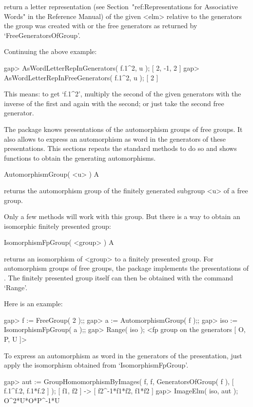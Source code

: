 return a letter representation
(see Section~"ref:Representations for Associative Words" in the {\GAP}
Reference Manual)
of the given <elm> relative to the generators the group was created
with or the free generators as returned by `FreeGeneratorsOfGroup'.

Continuing the above example:

\beginexample
gap> AsWordLetterRepInGenerators( f.1^2, u );    
[ 2, -1, 2 ]
gap> AsWordLetterRepInFreeGenerators( f.1^2, u );
[ 2 ]
\endexample

This means: to get `f.1^2', multiply the second of the given generators
with the inverse of the first and again with the second; or just take
the second free generator.


The {\FGA} package knows presentations of the automorphism groups of free
groups. It also allows to express an automorphism as word in the
generators of these presentations.
This sections repeats the {\GAP} standard methods to do so and shows
functions to obtain the generating automorphisms.

\>AutomorphismGroup( <u> ) A

returns the automorphism group of the finitely generated subgroup <u>
of a free group.

Only a few methods will work with this group. But there is a way to
obtain an isomorphic finitely presented group:

\>IsomorphismFpGroup( <group> ) A

returns an isomorphism of <group> to a finitely presented group.  
For automorphism groups of free groups, the {\FGA} package implements
the presentations of \cite{Neumann33}.
The finitely presented group itself can then be obtained with the
command `Range'.

Here is an example:

\beginexample
gap> f := FreeGroup( 2 );;
gap> a := AutomorphismGroup( f );;
gap> iso := IsomorphismFpGroup( a );;
gap> Range( iso );
<fp group on the generators [ O, P, U ]>
\endexample

To express an automorphism as word in the generators of the
presentation, just apply the isomorphism obtained from
`IsomorphismFpGroup'.

\beginexample
gap> aut := GroupHomomorphismByImages( f, f,
               GeneratorsOfGroup( f ), [ f.1^f.2, f.1*f.2 ] );
[ f1, f2 ] -> [ f2^-1*f1*f2, f1*f2 ]
gap> ImageElm( iso, aut );
O^2*U*O*P^-1*U
\endexample

